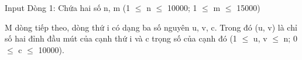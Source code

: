 Input
Dòng 1: Chứa hai số n, m (1  $\le$  n  $\le$  10000; 1  $\le$  m  $\le$  15000)  

   M dòng tiếp theo, dòng thứ i có dạng ba số nguyên u, v, c. Trong đó (u, v) là chỉ số hai đỉnh đầu mút của cạnh thứ i và c trọng số của cạnh đó (1  $\le$  u, v  $\le$  n; 0  $\le$  c  $\le$  10000).